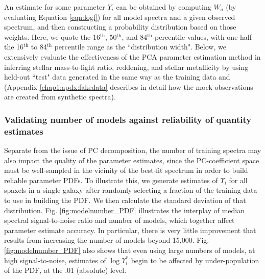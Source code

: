 An estimate for some parameter $Y_i$ can be obtained by computing $W_a$ (by evaluating Equation \ref{eqn:logl}) for all model spectra and a given observed spectrum, and then constructing a probability distribution based on those weights. Here, we quote the 16$^{\textrm{th}}$, 50$^{\textrm{th}}$, and 84$^{\textrm{th}}$ percentile values, with one-half the 16$^{\textrm{th}}$ to 84$^{\textrm{th}}$ percentile range as the ``distribution width". Below, we extensively evaluate the effectiveness of the PCA parameter estimation method in inferring stellar mass-to-light ratio, reddening, and stellar metallicity by using held-out ``test" data generated in the same way as the training data and (Appendix \ref{chap1:apdx:fakedata} describes in detail how the mock observations are created from synthetic spectra).

\subsubsection{Validating number of models against reliability of quantity estimates}
\label{chap1:subsec:pdf_population}

Separate from the issue of PC decomposition, the number of training spectra may also impact the quality of the parameter estimates, since the PC-coefficient space must be well-sampled in the vicinity of the best-fit spectrum in order to build reliable parameter PDFs. To illustrate this, we generate estimates of $\Upsilon_i$ for all spaxels in a single galaxy after randomly selecting a fraction of the training data to use in building the PDF. We then calculate the standard deviation of that distribution. Fig. \ref{fig:modelnumber_PDF} illustrates the interplay of median spectral signal-to-noise ratio and number of models, which together affect parameter estimate accuracy. In particular, there is very little improvement that results from increasing the number of models beyond 15,000. Fig. \ref{fig:modelnumber_PDF} also shows that even using large numbers of models, at high signal-to-noise, estimates of $\log{\Upsilon^*_i}$ begin to be affected by under-population of the PDF, at the .01 (absolute) level.

